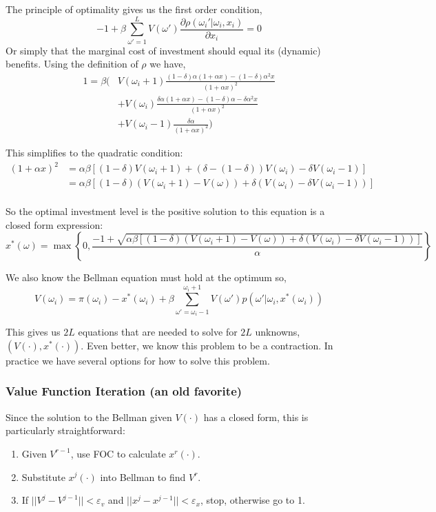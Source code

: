 \documentclass[twoside]{article}
\begin{document}
The principle of optimality gives us the first order condition, 
$$ -1 + \beta  \sum_{\omega' = 1}^L V(\omega') \frac{\partial \rho(\omega_i' | \omega_i, x_i)}{\partial x_i} = 0 $$
Or simply that the marginal cost of investment should equal its (dynamic) benefits. Using the definition of $\rho$ we have, 
\begin{align*}
1 = \beta \bigg( & V(\omega_i + 1)  \frac{(1-\delta)\alpha(1+\alpha x) - (1-\delta) \alpha^2 x}{(1 + \alpha x)^2}\\
& + V(\omega_i) \frac{\delta \alpha (1+\alpha x) - (1-\delta) \alpha - \delta \alpha^2 x}{(1 + \alpha x)^2} \\
& +V(\omega_i - 1) \frac{\delta \alpha}{(1+\alpha x)^2} \bigg)
\end{align*}

This simplifies to the quadratic condition: 
\begin{align*}
(1 + \alpha x)^2 & = \alpha \beta \left[ (1 - \delta) V(\omega_i + 1) + (\delta - (1 - \delta)) V(\omega_i) - \delta V(\omega_i - 1) \right] \\
& = \alpha \beta \left[ (1 - \delta) (V(\omega_i + 1) - V(\omega)) + \delta(V(\omega_i) - \delta V(\omega_i - 1)) \right]  \\
\end{align*}

So the optimal investment level is the positive solution to this equation is a closed form expression: 
$$ x^*(\omega) = \max\left\{0, \frac{-1 + \sqrt{\alpha \beta \left[ (1 - \delta) (V(\omega_i + 1) - V(\omega)) + \delta(V(\omega_i) - \delta V(\omega_i - 1)) \right] } }{\alpha} \right\} $$

We also know the Bellman equation must hold at the optimum so, 
$$ V(\omega_i) = \pi(\omega_i) - x^*(\omega_i) + \beta \sum_{\omega' = \omega_i-1}^{\omega_i + 1} V(\omega') p(\omega' | \omega_i, x^*(\omega_i))$$

This gives us $2L$ equations that are needed to solve for $2L$ unknowns, $(V(\cdot), x^*(\cdot))$. Even better, we know this problem to be a contraction. 
In practice we have several options for how to solve this problem. 

\subsubsection{Value Function Iteration (an old favorite)}

Since the solution to the Bellman given $V(\cdot)$ has a closed form, this is particularly straightforward: 
\begin{enumerate}
\item Given $V^{r-1}$, use FOC to calculate $x^r(\cdot)$. 
\item Substitute $x^j(\cdot)$ into Bellman to find $V^r$. 
\item If $||V^j - V^{j-1}|| < \varepsilon_v$ and $||x^j - x^{j-1}|| < \varepsilon_x$, stop, otherwise go to 1. 
\end{enumerate}
\end{document}
